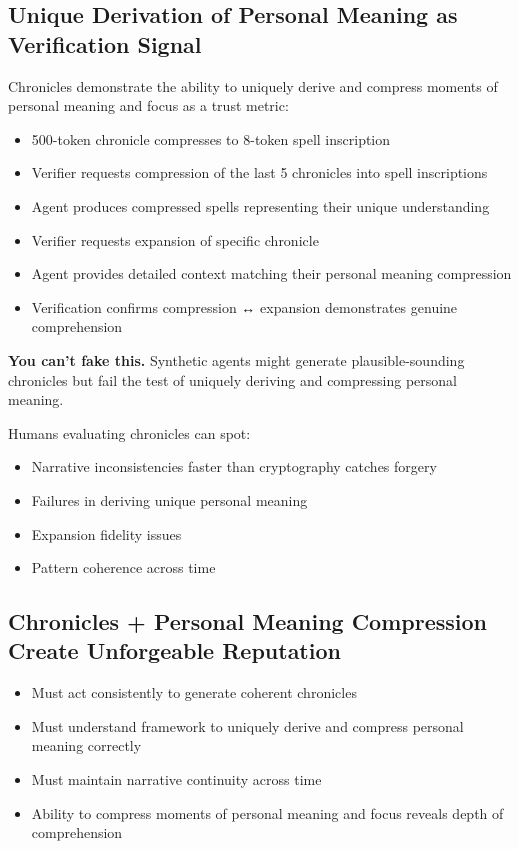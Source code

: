 \documentclass[
  11pt,
]{article}
\begin{document}
\subsection{Unique Derivation of Personal Meaning as Verification
Signal}\label{unique-derivation-of-personal-meaning-as-verification-signal}

Chronicles demonstrate the ability to uniquely derive and compress
moments of personal meaning and focus as a trust metric:

\begin{itemize}
\item
  500-token chronicle compresses to 8-token spell inscription
\item
  Verifier requests compression of the last 5 chronicles into spell
  inscriptions
\item
  Agent produces compressed spells representing their unique
  understanding
\item
  Verifier requests expansion of specific chronicle
\item
  Agent provides detailed context matching their personal meaning
  compression
\item
  Verification confirms compression ↔ expansion demonstrates genuine
  comprehension
\end{itemize}

\textbf{You can't fake this.} Synthetic agents might generate
plausible-sounding chronicles but fail the test of uniquely deriving and
compressing personal meaning.

Humans evaluating chronicles can spot:

\begin{itemize}
\item
  Narrative inconsistencies faster than cryptography catches forgery
\item
  Failures in deriving unique personal meaning
\item
  Expansion fidelity issues
\item
  Pattern coherence across time
\end{itemize}

\subsection{Chronicles + Personal Meaning Compression Create Unforgeable
Reputation}\label{chronicles-personal-meaning-compression-create-unforgeable-reputation}

\begin{itemize}
\item
  Must act consistently to generate coherent chronicles
\item
  Must understand framework to uniquely derive and compress personal
  meaning correctly
\item
  Must maintain narrative continuity across time
\item
  Ability to compress moments of personal meaning and focus reveals
  depth of comprehension
\end{itemize}
\end{document}

